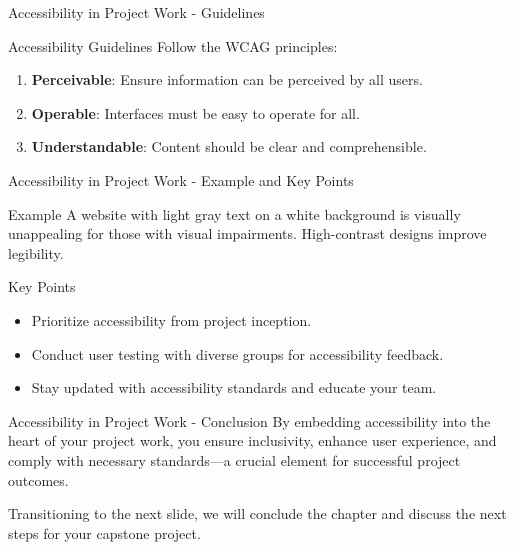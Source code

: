 \documentclass[aspectratio=169]{beamer}
\begin{document}
\begin{frame}[fragile]{Accessibility in Project Work - Guidelines}
    \begin{block}{Accessibility Guidelines}
        Follow the WCAG principles:
        \begin{enumerate}
            \item \textbf{Perceivable}: Ensure information can be perceived by all users.
            \item \textbf{Operable}: Interfaces must be easy to operate for all.
            \item \textbf{Understandable}: Content should be clear and comprehensible.
        \end{enumerate}
    \end{block}
\end{frame}

\begin{frame}[fragile]{Accessibility in Project Work - Example and Key Points}
    \begin{block}{Example}
        A website with light gray text on a white background is visually unappealing for those with visual impairments. High-contrast designs improve legibility.
    \end{block}

    \begin{block}{Key Points}
        \begin{itemize}
            \item Prioritize accessibility from project inception.
            \item Conduct user testing with diverse groups for accessibility feedback.
            \item Stay updated with accessibility standards and educate your team.
        \end{itemize}
    \end{block}
\end{frame}

\begin{frame}[fragile]{Accessibility in Project Work - Conclusion}
    By embedding accessibility into the heart of your project work, you ensure inclusivity, enhance user experience, and comply with necessary standards—a crucial element for successful project outcomes.

    Transitioning to the next slide, we will conclude the chapter and discuss the next steps for your capstone project.
\end{frame}
\end{document}
